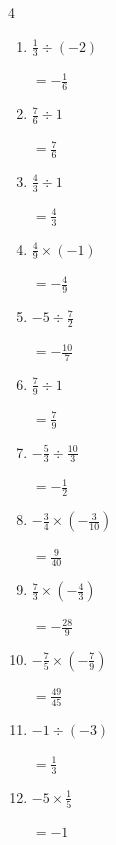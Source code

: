 \begin{multicols}{4}
\begin{enumerate}
  \item $\displaystyle \frac{1}{3}\div{}\left(-2\right)$

        $\displaystyle =-\frac{1}{6}$

  \item $\displaystyle \frac{7}{6}\div{}1$

        $\displaystyle =\frac{7}{6}$

  \item $\displaystyle \frac{4}{3}\div{}1$

        $\displaystyle =\frac{4}{3}$

  \item $\displaystyle \frac{4}{9}\times{}\left(-1\right)$

        $\displaystyle =-\frac{4}{9}$

  \item $\displaystyle -5\div{}\frac{7}{2}$

        $\displaystyle =-\frac{10}{7}$

  \item $\displaystyle \frac{7}{9}\div{}1$

        $\displaystyle =\frac{7}{9}$

  \item $\displaystyle -\frac{5}{3}\div{}\frac{10}{3}$

        $\displaystyle =-\frac{1}{2}$

  \item $\displaystyle -\frac{3}{4}\times{}\left(-\frac{3}{10}\right)$

        $\displaystyle =\frac{9}{40}$

  \item $\displaystyle \frac{7}{3}\times{}\left(-\frac{4}{3}\right)$

        $\displaystyle =-\frac{28}{9}$

\columnbreak %

  \item $\displaystyle -\frac{7}{5}\times{}\left(-\frac{7}{9}\right)$

        $\displaystyle =\frac{49}{45}$

  \item $\displaystyle -1\div{}\left(-3\right)$

        $\displaystyle =\frac{1}{3}$

  \item $\displaystyle -5\times{}\frac{1}{5}$

        $\displaystyle =-1$


\end{enumerate}
\end{multicols}
